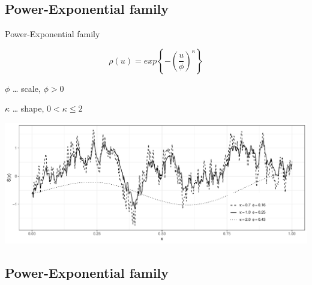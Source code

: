 \documentclass[
  ignorenonframetext,
]{beamer}
\begin{document}
\hypertarget{power-exponential-family-1}{%
\subsection{Power-Exponential family}\label{power-exponential-family-1}}

\begin{frame}{Power-Exponential family}
\large

\[\rho(u)=exp\left\{-\left(\frac{u}{\phi}\right)^\kappa\right\}\]

\small

\(\phi\) \ldots{} scale, \(\phi>0\)

\(\kappa\) \ldots{} shape, \(0<\kappa\le 2\)

\includegraphics{Lecture_1_files/figure-beamer/unnamed-chunk-11-1.pdf}
\end{frame}

\hypertarget{power-exponential-family-2}{%
\subsection{Power-Exponential family}\label{power-exponential-family-2}}
\end{document}
